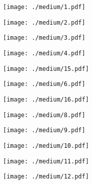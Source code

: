 \documentclass[runningheads]{llncs}
\begin{document}
\begin{figure*}[!htb]
    \centering
    \begin{minipage}{.5\textwidth}
        \centering
        \texttt{[image: ./medium/1.pdf]}
\end{minipage}\begin{minipage}{0.5\textwidth}
        \centering
        \texttt{[image: ./medium/2.pdf]}
\end{minipage}

    \begin{minipage}{0.5\textwidth}
        \centering
        \texttt{[image: ./medium/3.pdf]}
\end{minipage}\begin{minipage}{0.5\textwidth}
        \centering
        \texttt{[image: ./medium/4.pdf]}
\end{minipage}

    \begin{minipage}{0.5\textwidth}
        \centering
        \texttt{[image: ./medium/15.pdf]}
\end{minipage}\begin{minipage}{0.5\textwidth}
        \centering
        \texttt{[image: ./medium/6.pdf]}
\end{minipage}

    \begin{minipage}{0.5\textwidth}
        \centering
        \texttt{[image: ./medium/16.pdf]}
\end{minipage}\begin{minipage}{0.5\textwidth}
        \centering
        \texttt{[image: ./medium/8.pdf]}
\end{minipage}

    \begin{minipage}{0.5\textwidth}
        \centering
        \texttt{[image: ./medium/9.pdf]}
\end{minipage}\begin{minipage}{0.5\textwidth}
        \centering
        \texttt{[image: ./medium/10.pdf]}
\end{minipage}

    \begin{minipage}{0.5\textwidth}
        \centering
        \texttt{[image: ./medium/11.pdf]}
\end{minipage}\begin{minipage}{0.5\textwidth}
        \centering
        \texttt{[image: ./medium/12.pdf]}
\end{minipage}


\end{figure*}
\end{document}
